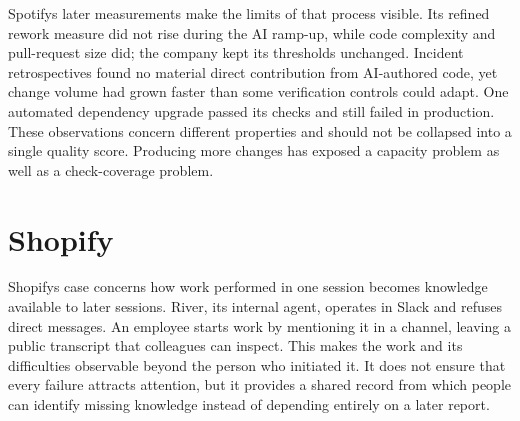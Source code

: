 
Spotify\textquotesingle s later measurements make the limits of that process visible. Its refined rework measure did not rise during the AI ramp-up, while code complexity and pull-request size did; the company kept its thresholds unchanged. Incident retrospectives found no material direct contribution from AI-authored code, yet change volume had grown faster than some verification controls could adapt. One automated dependency upgrade passed its checks and still failed in production\citep{singer2026quality}. These observations concern different properties and should not be collapsed into a single quality score. Producing more changes has exposed a capacity problem as well as a check-coverage problem.

\section{Shopify}\label{heading:shopify}


Shopify\textquotesingle s case concerns how work performed in one session becomes knowledge available to later sessions. River, its internal agent, operates in Slack and refuses direct messages. An employee starts work by mentioning it in a channel, leaving a public transcript that colleagues can inspect\citep{moreno2026river}. This makes the work and its difficulties observable beyond the person who initiated it. It does not ensure that every failure attracts attention, but it provides a shared record from which people can identify missing knowledge instead of depending entirely on a later report.


